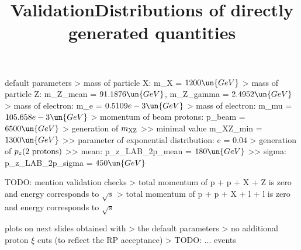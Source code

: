 \> default parameters
\>> mass of particle X: m\_X = $1200\un{GeV}$
\>> mass of particle Z: m\_Z\_mean = $91.1876\un{GeV}$, m\_Z\_gamma = $2.4952\un{GeV}$
\>> mass of electron: m\_e = $0.5109e-3\un{GeV}$
\>> mass of electron: m\_mu = $105.658e-3\un{GeV}$
\>> momentum of beam protons: p\_beam = $6500\un{GeV}$
\>> generation of $m_{\rm XZ}$
\>>> minimal value m\_XZ\_min = $1300\un{GeV}$
\>>> parameter of exponential distribution: c = $0.04$
\>> generation of $p_z(\hbox{2 protons})$
\>>> mean: p\_z\_LAB\_2p\_mean = $180\un{GeV}$
\>>> sigma: p\_z\_LAB\_2p\_sigma = $450\un{GeV}$



\newpage %
\title{Validation}

\> TODO: mention validation checks
\>> total momentum of p + p + X + Z is zero and energy corresponds to $\sqrt s$
\>> total momentum of p + p + X + l + l is zero and energy corresponds to $\sqrt s$

\> plots on next slides obtained with
\>> the default parameters
\>> no additional proton $\xi$ cuts (to reflect the RP acceptance)
\>> TODO: ... events



\newpage %
\title{Distributions of directly generated quantities}

\centerline{}


\newpage %

\centerline{}


\newpage %

\centerline{}


\newpage %

\centerline{}


\newpage %

\centerline{}


\newpage %

\centerline{}

\vfil
\eject
\bye
